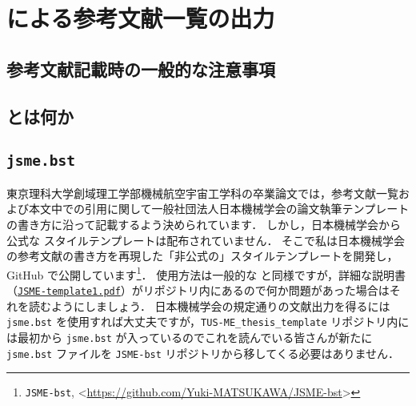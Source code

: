 \chapter{\BibTeX による参考文献一覧の出力}
\label{ch:bibtex}


\section{参考文献記載時の一般的な注意事項}
\label{sec:bibcaution}


\section{\BibTeX とは何か}
\label{sec:whatisbibtex}


\section{\texttt{jsme.bst}}
\label{sec:jsme-bst}


東京理科大学創域理工学部機械航空宇宙工学科の卒業論文では，参考文献一覧および本文中での引用に関して一般社団法人日本機械学会の論文執筆テンプレートの書き方に沿って記載するよう決められています．
しかし，日本機械学会から公式な \BibTeX スタイルテンプレートは配布されていません．
そこで私は日本機械学会の参考文献の書き方を再現した「非公式の」\BibTeX スタイルテンプレートを開発し，GitHub で公開しています\footnote{\texttt{JSME-bst}, \textless\url{https://github.com/Yuki-MATSUKAWA/JSME-bst}\textgreater}．
使用方法は一般的な \BibTeX と同様ですが，詳細な説明書（\href{https://github.com/Yuki-MATSUKAWA/JSME-bst/blob/main/JSME-template1.pdf}{\texttt{JSME-template1.pdf}}）がリポジトリ内にあるので何か問題があった場合はそれを読むようにしましょう．
日本機械学会の規定通りの文献出力を得るには \verb|jsme.bst| を使用すれば大丈夫ですが，\verb|TUS-ME_thesis_template| リポジトリ内には最初から \verb|jsme.bst| が入っているのでこれを読んでいる皆さんが新たに \verb|jsme.bst| ファイルを \verb|JSME-bst| リポジトリから移してくる必要はありません．



